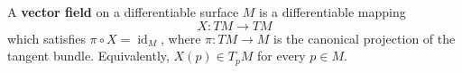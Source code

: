 A \textbf{vector field} on a differentiable surface $M$ is a differentiable mapping
$$X: TM \to TM$$
which satisfies $\pi \circ X = \operatorname{id}_M$, where $\pi: TM \to M$ is the canonical projection of the tangent bundle. Equivalently, $X(p) \in T_p M$ for every $p \in M$.
